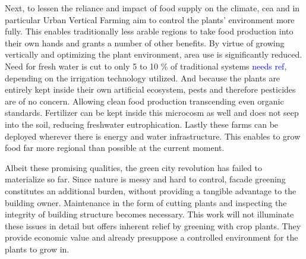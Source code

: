 Next, to lessen the reliance and impact of food supply on the climate, \ac{cea} and in particular Urban Vertical Farming aim to control the plants' environment more fully.
This enables traditionally less arable regions to take food production into their own hands and grants a number of other benefits. %
By virtue of growing vertically and optimizing the plant environment, area use is significantly reduced.
Need for fresh water is cut to only 5 to 10 \% of traditional systems \textcolor{blue}{needs ref}, depending on the irrigation technology utilized.
And because the plants are entirely kept inside their own artificial ecosystem, pests and therefore pesticides are of no concern.
Allowing clean food production transcending even organic standards.
Fertilizer can be kept inside this microcosm as well and does not seep into the soil, reducing freshwater eutrophication.
Lastly these farms can be deployed wherever there is energy and water infrastructure.
This enables to grow food far more regional than possible at the current moment.

Albeit these promising qualities, the green city revolution has failed to materialize so far.
Since nature is messy and hard to control, facade greening constitutes an additional burden, without providing a tangible advantage to the building owner.
Maintenance in the form of cutting plants and inspecting the integrity of building structure becomes necessary.
This work will not illuminate these issues in detail but offers inherent relief by greening with crop plants.
They provide economic value and already presuppose a controlled environment for the plants to grow in.

